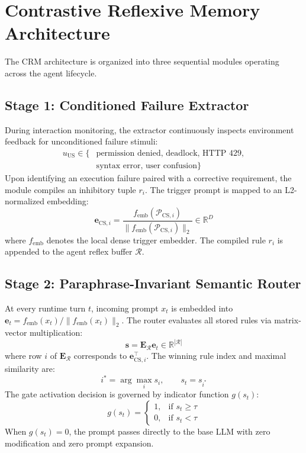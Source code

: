 \documentclass[11pt,journal,onecolumn]{IEEEtran}
\begin{document}
\section{Contrastive Reflexive Memory Architecture}

The CRM architecture is organized into three sequential modules operating across the agent lifecycle.

\subsection{Stage 1: Conditioned Failure Extractor}
During interaction monitoring, the extractor continuously inspects environment feedback for unconditioned failure stimuli:
\begin{equation}
\begin{aligned}
    u_{\text{US}} \in \{ & \text{permission denied},\, \text{deadlock},\, \text{HTTP 429}, \\
    & \text{syntax error},\, \text{user confusion} \}
\end{aligned}
\end{equation}
Upon identifying an execution failure paired with a corrective requirement, the module compiles an inhibitory tuple $r_i$. The trigger prompt is mapped to an L2-normalized embedding:
\begin{equation}
    \mathbf{e}_{\text{CS}, i} = \frac{f_{\text{emb}}(\mathcal{P}_{\text{CS}, i})}{\|f_{\text{emb}}(\mathcal{P}_{\text{CS}, i})\|_2} \in \mathbb{R}^D
\end{equation}
where $f_{\text{emb}}$ denotes the local dense trigger embedder. The compiled rule $r_i$ is appended to the agent reflex buffer $\mathcal{R}$.

\subsection{Stage 2: Paraphrase-Invariant Semantic Router}
At every runtime turn $t$, incoming prompt $x_t$ is embedded into $\mathbf{e}_t = f_{\text{emb}}(x_t) / \|f_{\text{emb}}(x_t)\|_2$. The router evaluates all stored rules via matrix-vector multiplication:
\begin{equation}
    \mathbf{s} = \mathbf{E}_{\mathcal{R}} \mathbf{e}_t \in \mathbb{R}^{|\mathcal{R}|}
\end{equation}
where row $i$ of $\mathbf{E}_{\mathcal{R}}$ corresponds to $\mathbf{e}_{\text{CS}, i}^\top$. The winning rule index and maximal similarity are:
\begin{equation}
    i^* = \arg\max_{i} s_i, \qquad s_t = s_{i^*}
\end{equation}
The gate activation decision is governed by indicator function $g(s_t)$:
\begin{equation}
    g(s_t) = \begin{cases}
        1, & \text{if } s_t \ge \tau \\
        0, & \text{if } s_t < \tau
    \end{cases}
\end{equation}
When $g(s_t) = 0$, the prompt passes directly to the base LLM with zero modification and zero prompt expansion.
\end{document}
